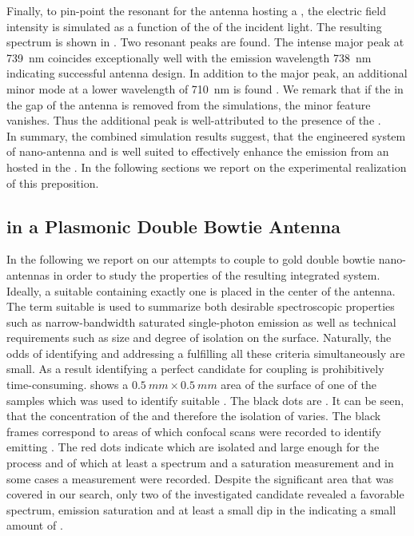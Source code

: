 		Finally, to pin-point the resonant \wl for the antenna hosting a \nd, the electric field intensity is simulated as a function of the \wl of the incident light. The resulting spectrum is shown in . Two resonant peaks are found. The intense major peak at \SI{739}{nm} coincides exceptionally well with the \siv emission wavelength \SI{738}{nm} indicating successful antenna design. In addition to the major peak, an additional minor mode at a lower wavelength of \SI{710}{nm} is found \cite{rahbany2016towards}. We remark that if the \nd in the gap of the antenna is removed from the simulations, the minor feature vanishes. Thus the additional peak is well-attributed to the presence of the \nd.
		\\
		In summary, the combined simulation results suggest, that the engineered system of nano-antenna and \nd is well suited to effectively enhance the emission from an \siv hosted in the \nd. In the following sections we report on the experimental realization of this preposition.

	\subsection{\siv in a Plasmonic Double Bowtie Antenna}

		In the following we report on our attempts to couple \sivs to gold double bowtie nano-antennas in order to study the properties of the resulting integrated system. Ideally, a suitable \nd containing exactly one \siv is placed in the center of the antenna. The term suitable is used to summarize both desirable spectroscopic properties such as narrow-bandwidth saturated single-photon emission as well as technical requirements such as \nd size and degree of isolation on the surface. Naturally, the odds of identifying and addressing a \nd fulfilling all these criteria simultaneously are small.
		As a result identifying a perfect candidate for coupling is prohibitively time-consuming.
		 shows a $\SI{0.5}{mm}\times\SI{0.5}{mm}$ area of the surface of one of the samples which was used to identify suitable \nds.
		The black dots are \nds.
		It can be seen, that the concentration of the \nds and therefore the isolation of \nds varies.
		The black frames correspond to areas of which confocal scans were recorded to identify \nds emitting \fl.
		The red dots indicate \nds which are isolated and large enough for the \pp process and of which at least a \pl spectrum and a saturation measurement and in some cases a \gt measurement were recorded.
		Despite the significant area that was covered in our search, only two of the investigated candidate \nds revealed a favorable spectrum, emission saturation and at least a small dip in the \gtf indicating a small amount of \sivs. 

